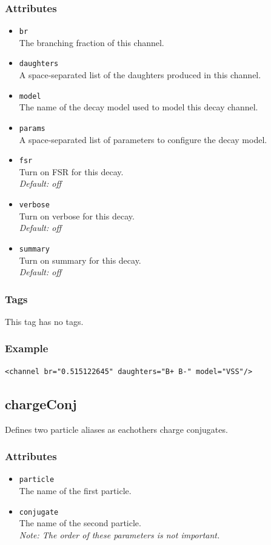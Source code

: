\subsubsection*{Attributes}
\begin{itemize}
\item{\tt br}\\
      The branching fraction of this channel.
\item{\tt daughters}\\
      A space-separated list of the daughters produced in this channel.
\item{\tt model}\\
      The name of the decay model used to model this decay channel.
\item{\tt params}\\
      A space-separated list of parameters to configure the decay model.
\item{\tt fsr}\\
      Turn on FSR for this decay.\\
      \emph{Default: off}
\item{\tt verbose}\\
      Turn on verbose for this decay.\\
      \emph{Default: off}
\item{\tt summary}\\
      Turn on summary for this decay.\\
      \emph{Default: off}
\end{itemize}
\subsubsection*{Tags}
This tag has no tags.
\subsubsection*{Example}
{\footnotesize
\begin{verbatim}
<channel br="0.515122645" daughters="B+ B-" model="VSS"/>
\end{verbatim}
}

\subsection{chargeConj}
Defines two particle aliases as eachothers charge conjugates.
\subsubsection*{Attributes}
\begin{itemize}
\item{\tt particle}\\
      The name of the first particle.
\item{\tt conjugate}\\
      The name of the second particle.\\
      \emph{Note: The order of these parameters is not important.}
\end{itemize}
